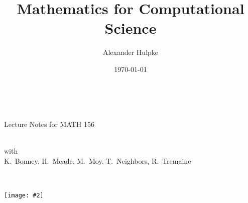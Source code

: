 \documentclass[10pt]{memoir}
\title{Mathematics for Computational Science}
\author{Alexander Hulpke}
\date{\today}
\theoremstyle{mybem}
\newcommand\anngraphics[3]{%
\texttt{[image: \#2]}%
}
\begin{document}
\frontmatter
%
%
%
%

\thispagestyle{empty}
\ \\
\vspace{1mm}
\begin{center}
{\huge\textbf{\thetitle}}
\bigskip

{\large Lecture Notes for MATH 156}
\bigskip
\bigskip

{\Large\theauthor}\\
{with\\
K.~Bonney,
H.~Meade,
M.~Moy,
T.~Neighbors,
R.~Tremaine}
\medskip

{\large\thedate}
\end{center}

\ \hspace{8cm}
\vspace{2mm}
\begin{center}
\anngraphics{10.5cm}{pic/Kandinsi_CirclesInACircle.jpg}{Decorative cover
image: Kandinsky, Circles in a circle, alluding to subset relations}
\end{center}
\vspace{5mm}
\end{document}
